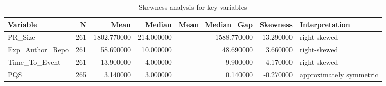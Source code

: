 \begin{table}
\caption{Skewness analysis for key variables}
\label{tab:appendix-b-skewness}
\begin{tabular}{lrrrrrl}
\toprule
Variable & N & Mean & Median & Mean_Median_Gap & Skewness & Interpretation \\
\midrule
PR_Size & 261 & 1802.770000 & 214.000000 & 1588.770000 & 13.290000 & right-skewed \\
Exp_Author_Repo & 261 & 58.690000 & 10.000000 & 48.690000 & 3.660000 & right-skewed \\
Time_To_Event & 261 & 13.900000 & 4.000000 & 9.900000 & 4.170000 & right-skewed \\
PQS & 265 & 3.140000 & 3.000000 & 0.140000 & -0.270000 & approximately symmetric \\
\bottomrule
\end{tabular}
\end{table}
